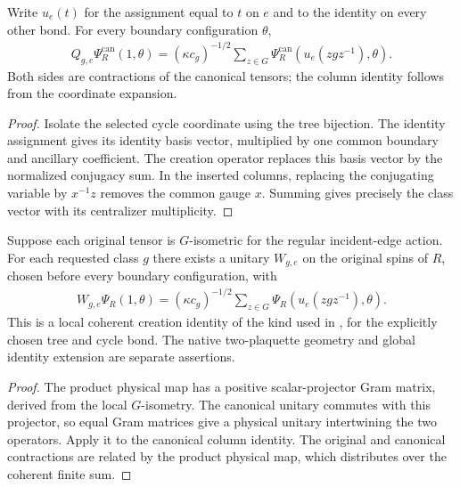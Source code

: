 \begin{lemma}%
    \label{thm:peps_regular_canonical_flux_creation}
    \leanok
    Write $u_e(t)$ for the assignment equal to $t$ on $e$ and to the identity
    on every other bond. For every boundary configuration $\theta$,
    \begin{align}
        Q_{g,e}\Psi_R^{\mathrm{can}}(1,\theta)
        =(\kappa c_g)^{-1/2}\sum_{z\in G}
        \Psi_R^{\mathrm{can}}(u_e(zgz^{-1}),\theta).
    \end{align}
    Both sides are contractions of the canonical tensors; the column identity
    follows from the coordinate expansion.
\end{lemma}
\begin{proof}\leanok
    Isolate the selected cycle coordinate using the tree bijection.
    The identity assignment gives its identity basis vector, multiplied by one
    common boundary and ancillary coefficient. The creation operator replaces
    this basis vector by the normalized conjugacy sum. In the inserted columns,
    replacing the conjugating variable by $x^{-1}z$ removes the common gauge $x$.
    Summing gives precisely the class vector with its centralizer multiplicity.
\end{proof}

\begin{lemma}%
    \label{thm:peps_regular_physical_flux_creation}
    \leanok
    Suppose each original tensor is $G$-isometric for the regular incident-edge
    action. For each requested class $g$ there exists a unitary $W_{g,e}$ on
    the original spins of $R$, chosen before every boundary configuration, with
    \begin{align}
        W_{g,e}\Psi_R(1,\theta)
        =(\kappa c_g)^{-1/2}\sum_{z\in G}\Psi_R(u_e(zgz^{-1}),\theta).
    \end{align}
    This is a local coherent creation identity of the kind used in
    \cite[Theorem 6.17]{Schuch2010PEPS}, for the explicitly chosen tree and cycle
    bond. The native two-plaquette geometry and global identity extension are
    separate assertions.
\end{lemma}
\begin{proof}\leanok
    The product physical map has a positive scalar-projector Gram matrix,
    derived from the local $G$-isometry. The canonical unitary commutes with
    this projector, so equal Gram matrices give a physical unitary intertwining
    the two operators. Apply it to the canonical column identity. The
    original and canonical contractions are related by the product physical
    map, which distributes over the coherent finite sum.
\end{proof}
